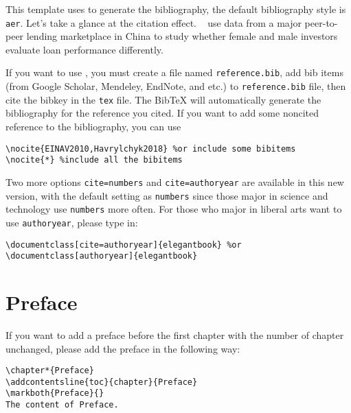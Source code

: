 \documentclass[fancy,blue,11pt]{elegantbook}
\begin{document}
This template uses  to generate the bibliography, the default bibliography style is \lstinline{aer}. Let's take a glance at the citation effect. ~\cite{en1} use data from a major peer-to-peer lending marketplace in China to study whether female and male investors evaluate loan performance differently. 

If you want to use , you must create a file named \lstinline{reference.bib}, add bib items (from Google Scholar, Mendeley, EndNote, and etc.) to \lstinline{reference.bib} file, then cite the bibkey in the \lstinline{tex} file. The Bib\TeX{} will automatically generate the bibliography for the reference you cited. If you want to add some noncited reference to the bibliography, you can use 
\begin{lstlisting}[frame=single]
\nocite{EINAV2010,Havrylchyk2018} %or include some bibitems
\nocite{*} %include all the bibitems
\end{lstlisting}

Two more options \lstinline{cite=numbers} and \lstinline{cite=authoryear} are available in this new version, with the default setting as \lstinline{numbers} since those major in science and technology use \lstinline{numbers} more often. For those who major in liberal arts want to use \lstinline{authoryear}, please type in:
\begin{lstlisting}
\documentclass[cite=authoryear]{elegantbook} %or
\documentclass[authoryear]{elegantbook}
\end{lstlisting}

\section{Preface}

If you want to add a preface before the first chapter with the number of chapter unchanged, please add the preface in the following way:
\begin{lstlisting}
\chapter*{Preface}
\addcontentsline{toc}{chapter}{Preface} 
\markboth{Preface}{} 
The content of Preface.
\end{lstlisting}
\end{document}

